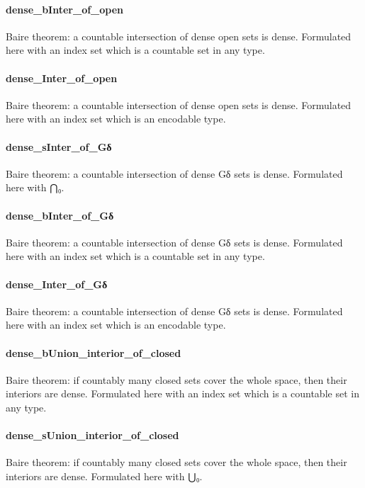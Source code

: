 \documentclass{article}
\begin{document}
\paragraph{dense\_bInter\_of\_open}
\par
Baire theorem: a countable intersection of dense open sets is dense. Formulated here with
an index set which is a countable set in any type.
\paragraph{dense\_Inter\_of\_open}
\par
Baire theorem: a countable intersection of dense open sets is dense. Formulated here with
an index set which is an encodable type.
\paragraph{dense\_sInter\_of\_Gδ}
\par
Baire theorem: a countable intersection of dense Gδ sets is dense. Formulated here with ⋂₀.
\paragraph{dense\_bInter\_of\_Gδ}
\par
Baire theorem: a countable intersection of dense Gδ sets is dense. Formulated here with
an index set which is a countable set in any type.
\paragraph{dense\_Inter\_of\_Gδ}
\par
Baire theorem: a countable intersection of dense Gδ sets is dense. Formulated here with
an index set which is an encodable type.
\paragraph{dense\_bUnion\_interior\_of\_closed}
\par
Baire theorem: if countably many closed sets cover the whole space, then their interiors
are dense. Formulated here with an index set which is a countable set in any type.
\paragraph{dense\_sUnion\_interior\_of\_closed}
\par
Baire theorem: if countably many closed sets cover the whole space, then their interiors
are dense. Formulated here with ⋃₀.
\end{document}
